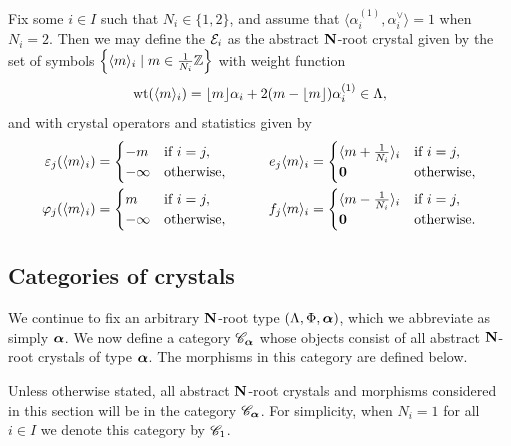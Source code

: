 \documentclass[11pt]{article}
\begin{document}
\begin{example}
\label{ex:elem_crystal}
Fix some $i \in I$ such that $N_i \in \{1,2\}$, and assume that $\langle \alpha_i^{(1)}, \alpha_i^{\vee}\rangle = 1$ when $N_i = 2$.
Then we may define the  $\cE_i$ as the abstract $\bfN$-root crystal given by the set of symbols $\left\{ \elem{i}{m} \mid m \in \frac{1}{N_i}\ZZ\right\}$ with weight function
\[
\weight(\elem{i}{m}) = \lfloor m \rfloor \alpha_i + 2(m - \lfloor m \rfloor) \alpha_i^{(1)} \in \Lambda,
\]
and with crystal operators and statistics given by
\begin{subequations} \label{eq:elem_crystal_def}
\begin{align}
\varepsilon_j(\elem{i}{m}) &= \begin{cases} -m & \text{if } i=j, \\ -\infty & \text{otherwise}, \end{cases}
\qquad&
e_j \elem{i}{m} &= \begin{cases} \elem{i}{m+\frac{1}{N_i}} & \text{if } i = j, \\ \zero & \text{otherwise}, \end{cases}
\\
\varphi_j(\elem{i}{m}) &= \begin{cases} m & \text{if } i=j, \\ -\infty & \text{otherwise}, \end{cases}
\qquad&
f_j \elem{i}{m} &= \begin{cases} \elem{i}{m-\frac{1}{N_i}} & \text{if } i = j, \\ \zero & \text{otherwise}. \end{cases}
\end{align}
\end{subequations}
\end{example}



\subsection{Categories of crystals}\label{cat-sect}

We continue to fix an arbitrary $\bfN$-root type $(\Lambda, \Phi, \bal)$,
which we abbreviate as simply $\bal$.
We now define a category $\sC_{\bal}$ whose objects consist of  all abstract $\bfN$-root crystals of 
type $\bal$. The morphisms in this category are defined below.

Unless otherwise stated, all abstract $\bfN$-root crystals and morphisms considered in this section will be  in the category $\sC_{\bal}$.
For simplicity, 
when $N_i = 1$ for all $i \in I$ we denote this category by $\sC_1$.
\end{document}
